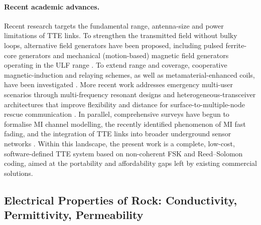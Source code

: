 \paragraph{Recent academic advances.} Recent research targets the fundamental
range, antenna-size and power limitations of TTE links. To strengthen the
transmitted field without bulky loops, alternative field generators have been
proposed, including pulsed ferrite-core generators \cite{bae2013} and mechanical
(motion-based) magnetic field generators operating in the ULF
range \cite{rezaei2020}. To extend range and coverage, cooperative
magnetic-induction and relaying schemes, as well as metamaterial-enhanced coils,
have been investigated \cite{ma2025survey}. More recent work addresses emergency
multi-user scenarios through multi-frequency resonant designs and
heterogeneous-transceiver architectures that improve flexibility and distance for
surface-to-multiple-node rescue communication \cite{wang2025}. In parallel,
comprehensive surveys have begun to formalise MI channel modelling, the recently
identified phenomenon of MI fast fading, and the integration of TTE links into
broader underground sensor networks \cite{ma2025survey}.
\newp
Within this landscape, the present work is a complete, low-cost, software-defined
TTE system based on non-coherent FSK and Reed--Solomon coding, aimed at the
portability and affordability gaps left by existing commercial solutions.







\subsection{Electrical Properties of Rock: Conductivity, Permittivity, Permeability}
\label{subsec:rock-properties}

